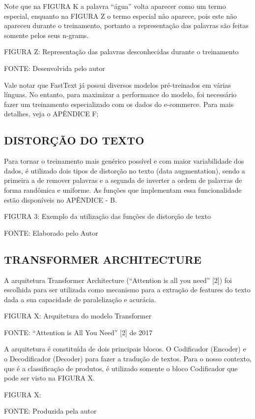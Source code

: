 Note que na FIGURA K a palavra “água” volta aparecer como um termo especial, enquanto na FIGURA Z o termo especial não aparece, pois este não apareceu durante o treinamento, portanto a representação das palavras são feitas somente pelos seus n-grams.

FIGURA Z: Representação das palavras desconhecidas durante o treinamento

FONTE: Desenvolvida pelo autor

Vale notar que FastText já possui diversos modelos pré-treinados em várias línguas. No entanto, para maximizar a performance do modelo, foi necessário fazer um treinamento especializado com os dados do e-commerce. Para mais detalhes, veja o APÊNDICE F;

\subsection{DISTORÇÃO DO TEXTO}

Para tornar o treinamento mais genérico possível e com maior variabilidade dos dados, é utilizado dois tipos de distorção no texto (data augmentation), sendo a primeira a de remover palavras e a segunda de inverter a ordem de palavras de forma randômica e uniforme. As funções que implementam essa funcionalidade estão disponíveis no APÊNDICE - B.

FIGURA 3: Exemplo da utilização das funções de distorção de texto

FONTE: Elaborado pelo Autor

\subsection{TRANSFORMER ARCHITECTURE}

A arquitetura Transformer Architecture (“Attention is all you need” [2]) foi escolhida para ser utilizada como mecanismo para a extração de features do texto dada a sua capacidade de paralelização e acurácia.

FIGURA X: Arquitetura do modelo Transformer

FONTE: “Attention is All You Need” [2] de 2017

A arquitetura é constituída de dois principais blocos. O Codificador (Encoder) e o Decodificador (Decoder) para fazer a tradução de textos. Para o nosso contexto, que é a classificação de produtos, é utilizado somente o bloco Codificador que pode ser visto na FIGURA X.

FIGURA X: 

FONTE: Produzida pela autor

